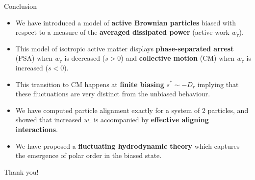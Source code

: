 \documentclass{beamer}
\begin{document}
\begin{frame}{Conclusion}

\pause
\begin{itemize}[<+->]
  \item We have introduced a model of {\bf active Brownian particles} biased with respect to a measure of the {\bf averaged dissipated power} (active work $w_{\tau}$).
  \item This model of isotropic active matter displays {\bf phase-separated arrest} (PSA) when $w_{\tau}$ is decreased ($s > 0$) and {\bf collective motion} (CM) when $w_{\tau}$ is increased ($s < 0$).
  \item This transition to CM happens at {\bf finite biasing} $s^* \sim -D_r$ implying that these fluctuations are very distinct from the unbiased behaviour.
  \item We have computed particle alignment exactly for a system of 2 particles, and showed that increased $w_{\tau}$ is accompanied by {\bf effective aligning interactions}.
  \item We have proposed a {\bf fluctuating hydrodynamic theory} which captures the emergence of polar order in the biased state.
\end{itemize}

\end{frame}


{
\footerwithoutframenumber
\begin{frame}[noframenumbering]

\begin{center}
\Huge
Thank you!
\end{center}

\end{frame}
}

\end{document}
